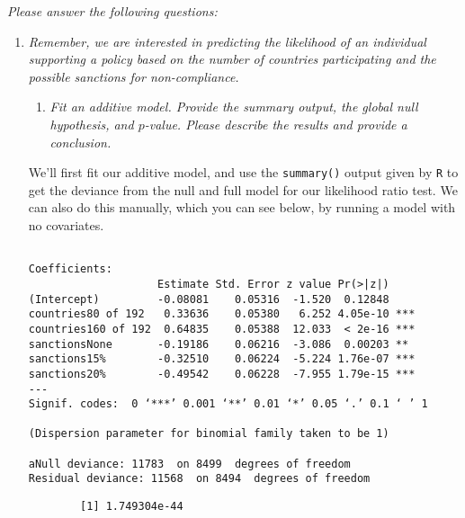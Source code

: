 \documentclass[12pt,letterpaper]{article}
\begin{document}
\newpage
\noindent \textit{Please answer the following questions:}

\begin{enumerate}
	\item
	\textit{Remember, we are interested in predicting the likelihood of an individual supporting a policy based on the number of countries participating and the possible sanctions for non-compliance.}
	\begin{enumerate}
		\item [] \textit{Fit an additive model. Provide the summary output, the global null hypothesis, and $p$-value. Please describe the results and provide a conclusion.}
	\end{enumerate}
	
		We’ll first fit our additive model, and use the \texttt{summary()} output given by \texttt{R} to get the deviance from the null and full model for our likelihood ratio test. We can also do this manually, which you can see below, by running a model with no covariates.
		
	 
	
	\begin{verbatim}

Coefficients:
                    Estimate Std. Error z value Pr(>|z|)    
(Intercept)         -0.08081    0.05316  -1.520  0.12848    
countries80 of 192   0.33636    0.05380   6.252 4.05e-10 ***
countries160 of 192  0.64835    0.05388  12.033  < 2e-16 ***
sanctionsNone       -0.19186    0.06216  -3.086  0.00203 ** 
sanctions15%        -0.32510    0.06224  -5.224 1.76e-07 ***
sanctions20%        -0.49542    0.06228  -7.955 1.79e-15 ***
---
Signif. codes:  0 ‘***’ 0.001 ‘**’ 0.01 ‘*’ 0.05 ‘.’ 0.1 ‘ ’ 1

(Dispersion parameter for binomial family taken to be 1)

aNull deviance: 11783  on 8499  degrees of freedom
Residual deviance: 11568  on 8494  degrees of freedom\end{verbatim}
	
	 
	
	\begin{verbatim}
		[1] 1.749304e-44
	\end{verbatim}

	 
	

\end{enumerate}
\end{document}
